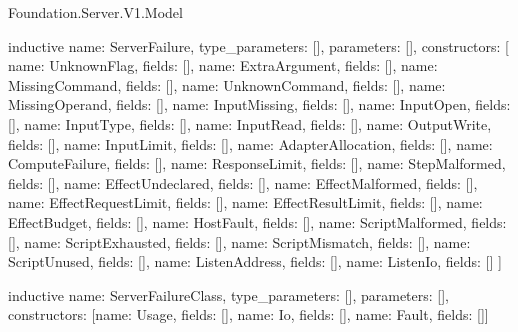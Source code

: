 \begin{lexlean}{Foundation.Server.V1.Model}
\begin{semanticmodule}
inductive{
  name: ServerFailure,
  type_parameters: [],
  parameters: [],
  constructors: [
    {name: UnknownFlag, fields: []},
    {name: ExtraArgument, fields: []},
    {name: MissingCommand, fields: []},
    {name: UnknownCommand, fields: []},
    {name: MissingOperand, fields: []},
    {name: InputMissing, fields: []},
    {name: InputOpen, fields: []},
    {name: InputType, fields: []},
    {name: InputRead, fields: []},
    {name: OutputWrite, fields: []},
    {name: InputLimit, fields: []},
    {name: AdapterAllocation, fields: []},
    {name: ComputeFailure, fields: []},
    {name: ResponseLimit, fields: []},
    {name: StepMalformed, fields: []},
    {name: EffectUndeclared, fields: []},
    {name: EffectMalformed, fields: []},
    {name: EffectRequestLimit, fields: []},
    {name: EffectResultLimit, fields: []},
    {name: EffectBudget, fields: []},
    {name: HostFault, fields: []},
    {name: ScriptMalformed, fields: []},
    {name: ScriptExhausted, fields: []},
    {name: ScriptMismatch, fields: []},
    {name: ScriptUnused, fields: []},
    {name: ListenAddress, fields: []},
    {name: ListenIo, fields: []}
  ]
}

inductive{
  name: ServerFailureClass,
  type_parameters: [],
  parameters: [],
  constructors: [{name: Usage, fields: []}, {name: Io, fields: []}, {name: Fault, fields: []}]
}


\end{semanticmodule}
\end{lexlean}
